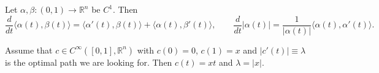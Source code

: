 \begin{lemma}
\label{lem:inner_product_derivative_identities}
Let $\alpha,\beta : (0,1) \to \mathbb{R}^n$ be $C^1$. Then
\[\frac{d}{dt}\langle\alpha(t),\beta(t)\rangle = \langle\alpha'(t),\beta(t)\rangle
  + \langle\alpha(t),\beta'(t)\rangle, \qquad
  \frac{d}{dt}\lvert\alpha(t)\rvert = \frac{1}{\lvert\alpha(t)\rvert}\langle\alpha(t),\alpha'(t)\rangle.\]
\end{lemma}

\begin{proposition}
\label{prop:geodesic_straight_line}
Assume that $c \in C^\infty([0,1],\mathbb{R}^n)$ with $c(0)=0$, $c(1)=x$ and
$\lvert c'(t)\rvert \equiv \lambda$ is the optimal path we are looking for. Then $c(t) = xt$
and $\lambda = \lvert x\rvert$.
\end{proposition}

